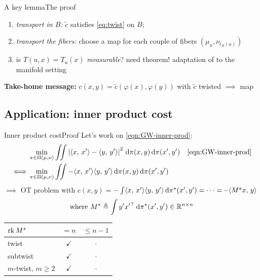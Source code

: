 \documentclass[9pt,xcolor={dvipsnames}]{beamer}
\begin{document}
\begin{frame}{A key lemma}{The proof}
    \begin{figure}[!h]
        \centering
        
    \end{figure}
    \begin{enumerate}
        \item \emph{transport in $B$:} $\tilde c$ satisfies \cref{eq:twist} on $B$;
        \item \emph{transport the fibers:} choose a map for each couple of fibers $(\mu_u,\nu_{t_B(u)})$
        \item is $T(u,x)=T_{u}(x)$ \emph{measurable}? need theorem! adaptation of \cite{fontbona2010measurability} to the manifold setting
    \end{enumerate}
    \textbf{Take-home message:} $c(x,y)=\tilde c(\varphi(x),\varphi(y))$ with $\tilde c$ twisted $\implies$ map
\end{frame}
\subsection{Application: inner product cost}
\begin{frame}{Inner product cost}{Proof}
    Let's work on \cref{eqn:GW-inner-prod}:
    \begin{align*}
        &\min _{\pi \in \Pi(\mu, \nu)} \iint\left|\langle x,\, x'\rangle-\langle y,\, y'\rangle\right|^{2} \dd\pi(x, y) \dd\pi(x', y') && \text{\cref{eqn:GW-inner-prod}}\\
        \iff&\min _{\pi \in \Pi(\mu, \nu)} \iint-\langle x,\, x'\rangle\langle y,\, y'\rangle \dd\pi(x, y) \dd\pi(x', y')
    \end{align*}
    $\implies$ OT problem with \emph{$c(x,y)=$}$-\int\langle x,\, x'\rangle\langle y,\, y'\rangle \,\mathrm d\pi^\star(x', y')=\dots=$\emph{$-\langle M^\star x,\,y\rangle$} $$\text{where }M^\star\triangleq\int y' x'^\top \,\mathrm d\pi^\star(x', y')\in \mathbb{R}^{n\times n}$$
    \begin{table}[h]
        \centering
        \label{tab:twist-inner}
        \begin{tabular}{lcc}
        $\operatorname*{rk} M^\star$ & $= n$          & $\leq n-1$        \\\hline
        twist         & $\checkmark$   &  $\cdot$          \\
        subtwist      & $\checkmark$   &  $\cdot$          \\
        $m$-twist, $m\geq2$     & $\checkmark$   &  $\cdot$
        \end{tabular}
    \end{table}
\end{frame}
\end{document}
